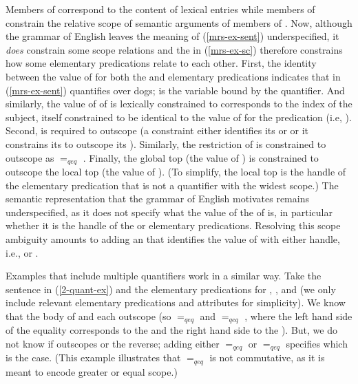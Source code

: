 \documentclass[output=paper]{langsci/langscibook}
\begin{document}
Members of  correspond to the content of lexical entries while members of  constrain the relative scope of semantic arguments of members of . Now, although the grammar of English leaves the meaning of (\ref{mrs-ex-sent}) underspecified, it \emph{does} constrain some scope relations and the  in (\ref{mrs-ex-sc}) therefore constrains how some elementary predications relate to each other. First, the identity between the value of  for both the  and  elementary predications indicates that  in (\ref{mrs-ex-sent}) quantifies over dogs;  is the variable bound by the quantifier. And similarly, the value of  of  is lexically constrained to corresponds to the index of the subject, itself constrained to be identical to the value of  for the  predication (i.e, ). Second,  is required to outscope  (a  constraint either identifies its  or  or it constrains its  to outscope its ). Similarly, the restriction of  is constrained to  outscope  as  $=_{qeq}$ . Finally, the global top (the value of ) is constrained to outscope the local top (the value of ). (To simplify, the local top is the handle of the elementary predication that is not a quantifier with the widest scope.) The semantic representation that the grammar of English motivates remains underspecified, as it does not specify what the value of the  of  is, in particular whether it is the handle of the  or  elementary predications. Resolving this scope ambiguity amounts to adding an  that identifies the value of  with either handle, i.e.,  or . 

Examples that include multiple quantifiers work in a similar way. Take the sentence in (\ref{2-quant-ex}) and the elementary predications for , , and  (we only include relevant elementary predications and attributes for simplicity). We know that the body of  and  each outscope  (so  $=_{qeq}$  and  $=_{qeq}$ , where the left hand side of the equality corresponds to the  and the right hand side to the ). But, we do not know if  outscopes  or the reverse; adding either   $=_{qeq}$  or  $=_{qeq}$  specifies which is the case. (This example illustrates that $=_{qeq}$ is not commutative, as it is meant to encode greater or equal scope.)
\end{document}
